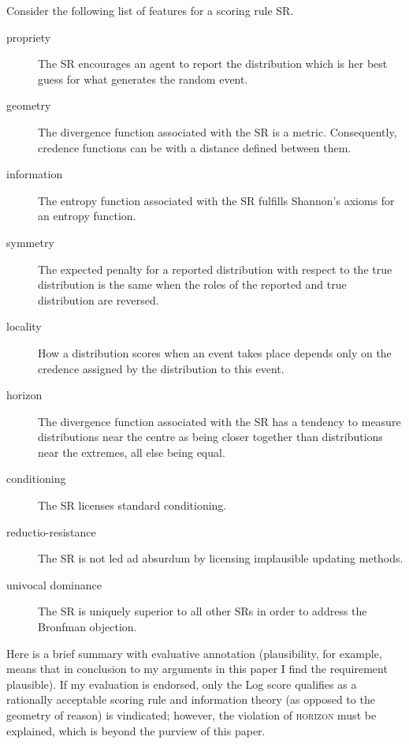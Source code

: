 \documentclass[12pt]{article}
\begin{document}
Consider the following list of features for a scoring rule SR.
\begin{description}
\item[propriety] The SR encourages an agent to report the
  distribution which is her best guess for what generates the random
  event.
\item[geometry] The divergence function associated with the SR
  is a metric. Consequently, credence functions can be
   with a distance defined between them.
\item[information] The entropy function associated with the SR
  fulfills Shannon's axioms for an entropy function. 
\item[symmetry] The expected penalty for a reported distribution with
  respect to the true distribution is the same when the roles of the
  reported and true distribution are reversed.
\item[locality] How a distribution scores when an event takes place
  depends only on the credence assigned by the distribution to this
  event.
\item[horizon] The divergence function associated with the SR has a
  tendency to measure distributions near the centre as being closer
  together than distributions near the extremes, all else being equal.
\item[conditioning] The SR licenses standard conditioning.
\item[reductio-resistance] The SR is not led ad absurdum by licensing
  implausible updating methods.
\item[univocal dominance] The SR is uniquely superior to all other SRs
  in order to address the Bronfman objection.
\end{description}

Here is a brief summary with evaluative annotation (plausibility, for
example, means that in conclusion to my arguments in this paper I find
the requirement plausible). If my evaluation is endorsed, only the Log
score qualifies as a rationally acceptable scoring rule and
information theory (as opposed to the geometry of reason) is
vindicated; however, the violation of \textsc{horizon} must be
explained, which is beyond the purview of this paper.

\medskip
\end{document}
